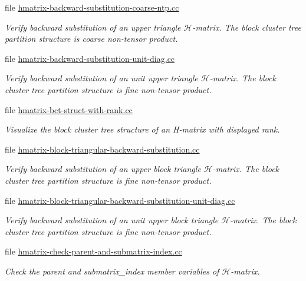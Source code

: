 \begin{DoxyCompactItemize}
file \hyperlink{hmatrix-backward-substitution-coarse-ntp_8cc}{hmatrix-\/backward-\/substitution-\/coarse-\/ntp.\+cc}
\begin{DoxyCompactList}\small\item\em Verify backward substitution of an upper triangle $\mathcal{H}$-\/matrix. The block cluster tree partition structure is coarse non-\/tensor product. \end{DoxyCompactList}\item 
file \hyperlink{hmatrix-backward-substitution-unit-diag_8cc}{hmatrix-\/backward-\/substitution-\/unit-\/diag.\+cc}
\begin{DoxyCompactList}\small\item\em Verify backward substitution of an unit upper triangle $\mathcal{H}$-\/matrix. The block cluster tree partition structure is fine non-\/tensor product. \end{DoxyCompactList}\item 
file \hyperlink{hmatrix-bct-struct-with-rank_8cc}{hmatrix-\/bct-\/struct-\/with-\/rank.\+cc}
\begin{DoxyCompactList}\small\item\em Visualize the block cluster tree structure of an H-\/matrix with displayed rank. \end{DoxyCompactList}\item 
file \hyperlink{hmatrix-block-triangular-backward-substitution_8cc}{hmatrix-\/block-\/triangular-\/backward-\/substitution.\+cc}
\begin{DoxyCompactList}\small\item\em Verify backward substitution of an upper block triangle $\mathcal{H}$-\/matrix. The block cluster tree partition structure is fine non-\/tensor product. \end{DoxyCompactList}\item 
file \hyperlink{hmatrix-block-triangular-backward-substitution-unit-diag_8cc}{hmatrix-\/block-\/triangular-\/backward-\/substitution-\/unit-\/diag.\+cc}
\begin{DoxyCompactList}\small\item\em Verify backward substitution of an unit upper block triangle $\mathcal{H}$-\/matrix. The block cluster tree partition structure is fine non-\/tensor product. \end{DoxyCompactList}\item 
file \hyperlink{hmatrix-check-parent-and-submatrix-index_8cc}{hmatrix-\/check-\/parent-\/and-\/submatrix-\/index.\+cc}
\begin{DoxyCompactList}\small\item\em Check the {\ttfamily parent} and {\ttfamily submatrix\+\_\+index} member variables of $\mathcal{H}$-\/matrix. \end{DoxyCompactList}\item 

\end{DoxyCompactItemize}
